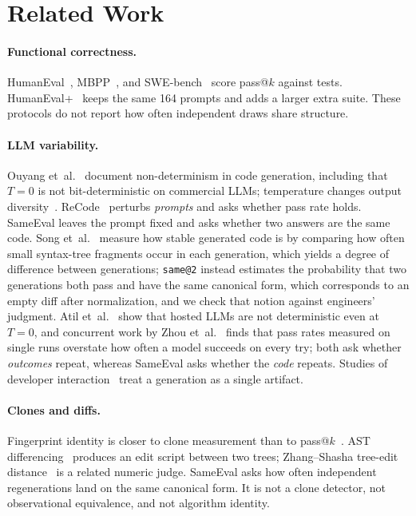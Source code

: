 \documentclass[acmsmall,screen,review,anonymous]{acmart}
\makeatletter
\newcommand{\sameeval}{SameEval}
\newcommand{\sameat}{\mbox{\texttt{same@2}}}
\newcommand{\etal}{et~al.}
\makeatother
\begin{document}
\section{Related Work}
\label{sec:related}

\paragraph{Functional correctness.}
HumanEval~\cite{chen2021evaluating}, MBPP~\cite{austin2021program}, and
SWE-bench~\cite{jimenez2024swebench} score pass@$k$ against tests.
HumanEval+~\cite{liu2023evalplus} keeps the same 164 prompts and adds a
larger extra suite.
These protocols do not report how often independent draws share structure.

\paragraph{LLM variability.}
Ouyang \etal{}~\cite{ouyang2023llm} document non-determinism in code
generation, including that $T{=}0$ is not bit-deterministic on commercial
LLMs; temperature changes output diversity~\cite{zhu2024hot}.
ReCode~\cite{wang2023recode} perturbs \emph{prompts} and asks whether pass
rate holds.
\sameeval{} leaves the prompt fixed and asks whether two answers are the same
code.
Song \etal{}~\cite{song2025structuralentropy} measure how stable generated
code is by comparing how often small syntax-tree fragments occur in each
generation, which yields a degree of difference between generations;
\sameat{} instead estimates the probability that two generations both pass
and have the same canonical form, which corresponds to an empty diff after
normalization, and we check that notion against engineers' judgment.
Atil \etal{}~\cite{atil2024nondeterminism} show that hosted LLMs are not
deterministic even at $T{=}0$, and concurrent work by Zhou
\etal{}~\cite{zhou2026repeatedrun} finds that pass rates measured on single
runs overstate how often a model succeeds on every try; both ask whether
\emph{outcomes} repeat, whereas \sameeval{} asks whether the \emph{code}
repeats.
Studies of developer interaction~\cite{vaithilingam2022expectation,barke2023grounded}
treat a generation as a single artifact.

\paragraph{Clones and diffs.}
Fingerprint identity is closer to clone measurement than to
pass@$k$~\cite{roy2009clone}.
AST differencing~\cite{falleri2014gumtree} produces an edit script between two
trees; Zhang--Shasha tree-edit distance~\cite{zhang1989simple} is a related
numeric judge.
\sameeval{} asks how often independent regenerations land on the same
canonical form.
It is not a clone detector, not observational equivalence, and not algorithm
identity.
\end{document}
